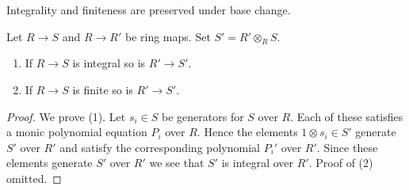 \begin{lemma}
\label{lemma-base-change-integral}
\begin{slogan}
Integrality and finiteness are preserved under base change.
\end{slogan}
Let $R \to S$ and $R \to R'$ be ring maps.
Set $S' = R' \otimes_R S$.
\begin{enumerate}
\item If $R \to S$ is integral so is $R' \to S'$.
\item If $R \to S$ is finite so is $R' \to S'$.
\end{enumerate}
\end{lemma}

\begin{proof}
We prove (1).
Let $s_i \in S$ be generators for $S$ over $R$.
Each of these satisfies a monic polynomial equation $P_i$
over $R$. Hence the elements $1 \otimes s_i \in S'$ generate
$S'$ over $R'$ and satisfy the corresponding polynomial
$P_i'$ over $R'$. Since these elements generate $S'$ over $R'$
we see that $S'$ is integral over $R'$.
Proof of (2) omitted.
\end{proof}
